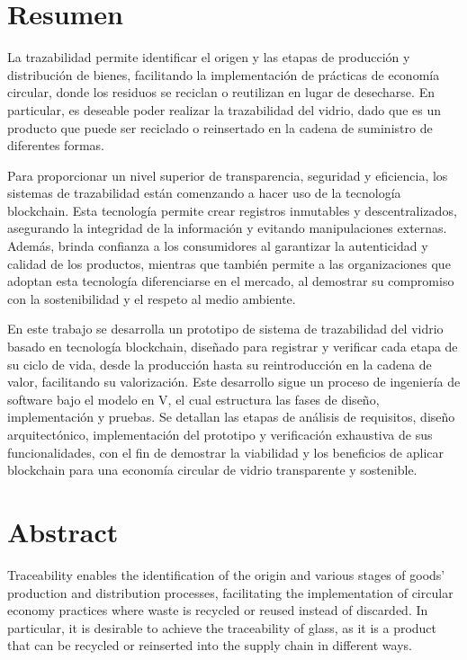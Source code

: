 \thispagestyle{plain}
\chapter*{Resumen}

La trazabilidad permite identificar el origen y las etapas de producción y distribución de bienes, facilitando la implementación de prácticas de economía circular, donde los residuos se reciclan o reutilizan en lugar de desecharse. En particular, es deseable poder realizar la trazabilidad del vidrio, dado que es un producto que puede ser reciclado o reinsertado en la cadena de suministro de diferentes formas.

Para proporcionar un nivel superior de transparencia, seguridad y eficiencia, los sistemas de trazabilidad están comenzando a hacer uso de la tecnología blockchain. Esta tecnología permite crear registros inmutables y descentralizados, asegurando la integridad de la información y evitando manipulaciones externas. Además, brinda confianza a los consumidores al garantizar la autenticidad y calidad de los productos, mientras que también permite a las organizaciones que adoptan esta tecnología diferenciarse en el mercado, al demostrar su compromiso con la sostenibilidad y el respeto al medio ambiente.

En este trabajo se desarrolla un prototipo de sistema de trazabilidad del vidrio basado en tecnología blockchain, diseñado para registrar y verificar cada etapa de su ciclo de vida, desde la producción hasta su reintroducción en la cadena de valor, facilitando su valorización. Este desarrollo sigue un proceso de ingeniería de software bajo el modelo en V, el cual estructura las fases de diseño, implementación y pruebas. Se detallan las etapas de análisis de requisitos, diseño arquitectónico, implementación del prototipo y verificación exhaustiva de sus funcionalidades, con el fin de demostrar la viabilidad y los beneficios de aplicar blockchain para una economía circular de vidrio transparente y sostenible.

\chapter*{Abstract}

Traceability enables the identification of the origin and various stages of goods' production and distribution processes, facilitating the implementation of circular economy practices where waste is recycled or reused instead of discarded. In particular, it is desirable to achieve the traceability of glass, as it is a product that can be recycled or reinserted into the supply chain in different ways.

